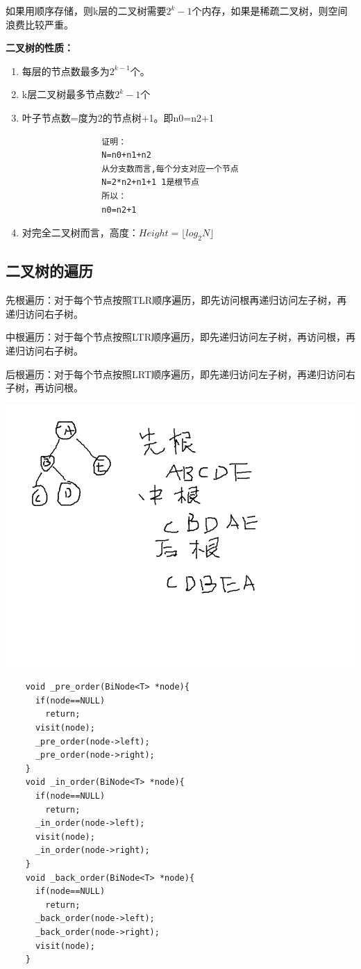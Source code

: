 \documentclass{article}
\begin{document}
	如果用顺序存储，则k层的二叉树需要$2^{k}-1$个内存，如果是稀疏二叉树，则空间浪费比较严重。

	\textbf{二叉树的性质：}
	\begin{enumerate}
		\item 每层的节点数最多为$2^{k-1}$个。
		\item k层二叉树最多节点数$2^{k}-1$个
		\item 叶子节点数=度为2的节点树+1。即n0=n2+1
			\begin{verbatim}
				证明：
				N=n0+n1+n2
				从分支数而言,每个分支对应一个节点
				N=2*n2+n1+1 1是根节点
				所以：
				n0=n2+1
			\end{verbatim}
		\item 对完全二叉树而言，高度：$Height=\lfloor log_2N \rfloor $
	\end{enumerate}
	\subsection{二叉树的遍历}
		先根遍历：对于每个节点按照TLR顺序遍历，即先访问根再递归访问左子树，再递归访问右子树。

		中根遍历：对于每个节点按照LTR顺序遍历，即先递归访问左子树，再访问根，再递归访问右子树。

		后根遍历：对于每个节点按照LRT顺序遍历，即先递归访问左子树，再递归访问右子树，再访问根。

		\includegraphics[scale=0.4]{./pic/tree-04.png}

		\begin{verbatim}
    void _pre_order(BiNode<T> *node){
      if(node==NULL)
        return;
      visit(node);
      _pre_order(node->left);
      _pre_order(node->right);
    }
    void _in_order(BiNode<T> *node){
      if(node==NULL)
        return;
      _in_order(node->left);
      visit(node);
      _in_order(node->right);
    }
    void _back_order(BiNode<T> *node){
      if(node==NULL)
        return;
      _back_order(node->left);
      _back_order(node->right);
      visit(node);
    }
		\end{verbatim}
\end{document}
